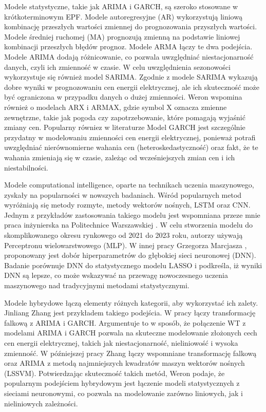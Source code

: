 Modele statystyczne, takie jak ARIMA i GARCH, są szeroko stosowane w krótkoterminowym EPF. Modele autoregresyjne (AR) wykorzystują liniową kombinację przeszłych wartości zmiennej do prognozowania przyszłych wartości. Modele średniej ruchomej (MA) prognozują zmienną na podstawie liniowej kombinacji przeszłych błędów prognoz. Modele ARMA łączy te dwa podejścia. Modele ARIMA dodają różnicowanie, co pozwala uwzględniać niestacjonarność danych, czyli ich zmienność w czasie. W celu uwzględnienia sezonowości wykorzystuje się również model SARIMA. Zgodnie z \cite{appliedmath3020018} modele SARIMA wykazują dobre wyniki w prognozowaniu cen energii elektrycznej, ale ich skuteczność może być ograniczona w przypadku danych o dużej zmienności. Weron \cite{WERON20141030} wspomina również o modelach ARX i ARMAX, gdzie symbol X oznacza zmienne zewnętrzne, takie jak pogoda czy zapotrzebowanie, które pomagają wyjaśnić zmiany cen. Popularny równiez w literaturze Model GARCH jest szczególnie przydatny w modelowaniu zmienności cen energii elektrycznej, ponieważ potrafi uwzględniać nierównomierne wahania cen (heteroskedastyczność) oraz fakt, że te wahania zmieniają się w czasie, zależąc od wcześniejszych zmian cen i ich niestabilności.

Modele computational intelligence, oparte na technikach uczenia maszynowego, zyskały na popularności w nowszych badaniach. Wśród popularnych metod wyróżniają się metody rozmyte, metody wektorów nośnych, LSTM oraz CNN. Jednym z przykładów zastosowania takiego modelu jest wspomniana przeze mnie praca inżynierska na Politechnice Warszawskiej \cite{MGR2025}. W celu stworzenia modelu do skomplikowanego okresu rynkowego od 2021 do 2023 roku, autorzy używają Perceptronu wielowarstwowego (MLP). W innej pracy Grzegorza Marcjasza \cite{en13184605}, proponowany jest dobór hiperparametrów do głębokiej sieci neuronowej (DNN). Badanie porównuje DNN do statystycznego modelu LASSO i podkreśla, iż wyniki DNN są lepsze, co może wskazywać na przewagę nowoczesnego uczenia maszynowego nad tradycyjnymi metodami statystycznymi.

Modele hybrydowe łączą elementy różnych kategorii, aby wykorzystać ich zalety. Jinliang Zhang jest przykładem takiego podejścia. W pracy \cite{TAN20103606} łączy transformację falkową z ARIMA i GARCH. Argumentuje to w sposób, że połączenie WT z modelami ARIMA i GARCH pozwala na skuteczne modelowanie złożonych cech cen energii elektrycznej, takich jak niestacjonarność, nieliniowość i wysoka zmienność. W późniejszej pracy Zhang \cite{ZHANG2012695} łączy wspomniane transformację falkową oraz ARIMA z metodą najmniejszych kwadratów maszyn wektorów nośnych (LSSVM). Potwierdzając skuteczność takich metód, Weron \cite{WERON20141030} podaje, że popularnym podejściem hybrydowym jest łączenie modeli statystycznych z sieciami neuronowymi, co pozwala na modelowanie zarówno liniowych, jak i nieliniowych zależności.

